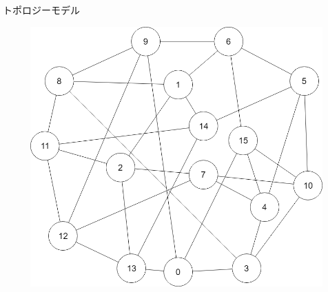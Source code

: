 \documentclass[11pt, dvipdfmx]{beamer}
\begin{document}
\begin{frame}
\begin{columns}[totalwidth=1\textwidth]
\begin{exampleblock}{トポロジーモデル}
\begin{figure}
\includegraphics[width=\columnwidth]{./fig/Network.png}
\end{figure}
\end{exampleblock}
\end{columns}
\end{frame}
\end{document}
